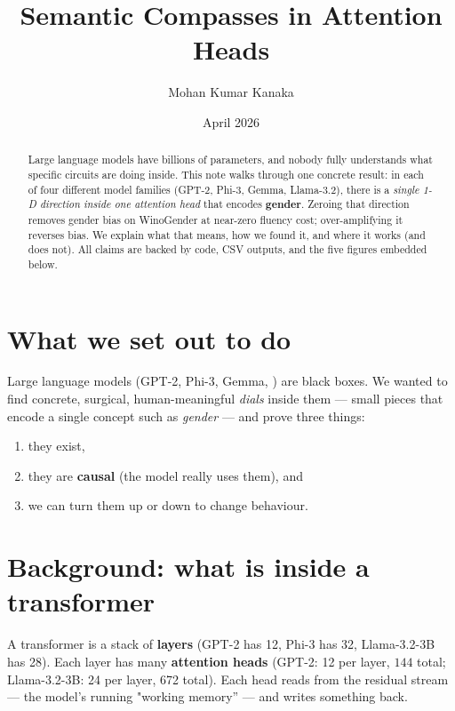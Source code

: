 \documentclass[11pt]{article}
\title{\textbf{Semantic Compasses in Attention Heads}}
\author{Mohan Kumar Kanaka}
\date{April 2026}
\begin{document}
\maketitle

\vspace{-10pt}
\begin{abstract}
\noindent Large language models have billions of parameters, and nobody
fully understands what specific circuits are doing inside. This note
walks through one concrete result: in each of four different model
families (GPT-2, Phi-3, Gemma, Llama-3.2), there is a \emph{single 1-D
direction inside one attention head} that encodes \textbf{gender}.
Zeroing that direction removes gender bias on WinoGender at near-zero
fluency cost; over-amplifying it reverses bias. We explain what that
means, how we found it, and where it works (and does not). All claims
are backed by code, CSV outputs, and the five figures embedded below.
\end{abstract}

\section{What we set out to do}
Large language models (GPT-2, Phi-3, Gemma, \textellipsis) are black
boxes. We wanted to find concrete, surgical, human-meaningful
\emph{dials} inside them --- small pieces that encode a single concept
such as \emph{gender} --- and prove three things:
\begin{enumerate}[leftmargin=*,nosep]
    \item they exist,
    \item they are \textbf{causal} (the model really uses them), and
    \item we can turn them up or down to change behaviour.
\end{enumerate}

\section{Background: what is inside a transformer}
A transformer is a stack of \textbf{layers} (GPT-2 has 12, Phi-3 has
32, Llama-3.2-3B has 28). Each layer has many \textbf{attention heads}
(GPT-2: 12 per layer, $144$ total; Llama-3.2-3B: 24 per layer, 672
total). Each head reads from the residual stream --- the model's
running "working memory'' --- and writes something back.
\end{document}
